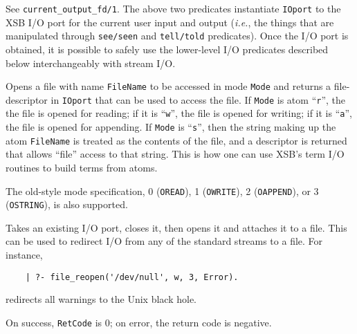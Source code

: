 \begin{description}

 
   See {\tt current\_output\_fd/1}.
 
   The above two predicates instantiate {\tt IOport} to the XSB I/O port
   for the current user input and output ({\it i.e.}, the things 
   that are manipulated through {\tt see/seen} and {\tt tell/told} predicates).
   Once the I/O port is obtained, it is possible to safely use the
   lower-level I/O predicates described below interchangeably with stream
   I/O. 
    
 
    Opens a file with name {\tt FileName} to be accessed
    in mode {\tt Mode} and returns a file-descriptor in {\tt IOport} that
    can be used to access the file.  If {\tt Mode} is atom ``{\tt r}'', the
    the file is opened for reading; if it is ``{\tt w}'', the file is
    opened for writing; if it is ``{\tt a}'', the file is opened for
    appending.  If {\tt Mode} is ``{\tt s}'', then the string making
    up the atom {\tt FileName} is treated as the contents of the file, and
    a descriptor is returned that allows ``file'' access to that string.
    This is how one can use XSB's term I/O routines to build terms from
    atoms.

    The old-style mode specification, 0 ({\tt OREAD}), 1 ({\tt OWRITE}), 2
    ({\tt OAPPEND}), or 3 ({\tt OSTRING}), is also supported.

    Takes an existing I/O port, closes it, then opens it and
    attaches it to a file. This can be used to redirect I/O from any of the
    standard streams to a file. For instance, 
\begin{verbatim}
    | ?- file_reopen('/dev/null', w, 3, Error).
\end{verbatim}
    redirects all warnings to the Unix black hole. 

    On success, {\tt RetCode} is 0; on error, the return code is negative.


\end{description}
